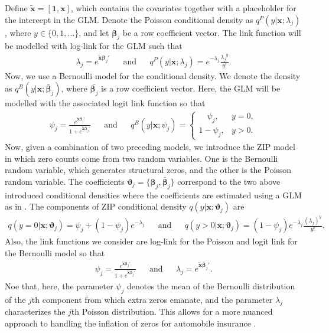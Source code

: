 \documentclass[11pt,letterpaper]{article}
\numberwithin{equation}{section}
\numberwithin{equation}{section}
\numberwithin{equation}{section}
\newcommand{\xTilda}{\tilde{\bm{x}}}
\begin{document}
Define $\xTilda = [\bm{1},\bm{x}]$, which contains the covariates together with a placeholder for the intercept in the GLM. Denote the Poisson conditional density  as $ q^P(y|\bm{x}; \lambda_j) $, where $y \in \{0,1,\dots\}$, and let $\bm{\beta}_j$ be a row coefficient vector.
The link function will be modelled with log-link for the GLM such that
 \begin{align*}
\lambda_j = e^{\xTilda \bm{\beta}_j'} && \text{and} & & %
q^P(y|\bm{ x} ; \lambda_{j} ) = e^{-\lambda_j} \frac{{\lambda_j}^y}{y!}.
 \end{align*}
Now, we use a Bernoulli model for the conditional density. We denote the density as $ q^{B}(y|\bm{x}; \bm{\bar{\beta}}_j) $, where $\bar{\bm{\beta}_j}$ is a row coefficient vector.  Here, the GLM will be modelled with the associated logit link function so that
 \begin{align*}
 \psi_j =  \frac{e^{\xTilda \bm{\bar{\beta}}_j'}}{1+ e^{\xTilda  \bm{\bar{\beta}}_j'}}  && \text{and} && 
 q^B(y | \bm{x} ; {\psi}_j) = \begin{cases}
      \quad \psi_j, & y = 0,\\
     1 -  \psi_j,  & y > 0.
   \end{cases}
 \end{align*}
 Now, given a combination of two preceding models, we introduce the ZIP model in which zero counts come from two random variables. One is the Bernoulli random variable, which generates structural zeros, and the other is the Poisson random variable. The coefficients $\bm{\vartheta}_{j}=\{ \bm{\beta}_{j},  \bm{\bar{\beta}}_j \}$ correspond to the two above introduced conditional densities where the coefficients are estimated using a GLM as in \cite{Lambert}. The components of ZIP conditional density $q(y|\bm{x}; \bm{\vartheta}_{j}  )$ are %
 \begin{align*}
 q( y = 0| \bm{x} ; \bm{ \vartheta}_{j}  ) = \psi_j + (1 - \psi_j)e^{-\lambda_j}  & &  \text{and}  & &
q(y > 0 |  \bm{x} ; \bm{ \vartheta}_{j}  ) = (1 - \psi_j)e^{-\lambda_j} \frac{\left(\lambda_j \right)^y  }{y!}.
 \end{align*}
Also, the link functions we consider are log-link for the Poisson and logit link for the Bernoulli model so that
 \begin{align}
 \psi_j =  \frac{e^{\xTilda \bm{\bar{\beta}}_j'}}{1+ e^{\xTilda \bm{\bar{\beta}}_j'}}  & & \text{and} & &
\lambda_j  = e^{\xTilda \bm{\beta}_j'}. \label{bern::ref}
 \end{align}
Noe that, here, the parameter $\psi_j$ denotes the mean of the Bernoulli distribution of the $j$th component from which extra zeros emanate, and the parameter $ \lambda_j $ characterizes the $j$th Poisson distribution. This allows for a more nuanced approach to handling the inflation of zeros for automobile insurance  \citep[see][]{Bermudez+Karlis:2012}.
\end{document}
